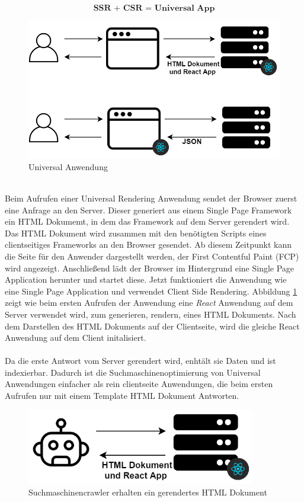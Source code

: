 \documentclass[runningheads]{llncs}
\numberwithin{figure}{section}
\begin{document}
\begin{equation*}
  \textbf{SSR + CSR = Universal App}
\end{equation*}
\begin{figure}[h]
  \centering
  \includegraphics[width=12cm]{images/react}
  \caption{Universal Anwendung}
  \label{Universal Anwendung}
\end{figure}
\\
Beim Aufrufen einer Universal Rendering Anwendung sendet der Browser
zuerst eine Anfrage an den Server. 
Dieser generiert aus einem Single Page Framework ein HTML Dokumemt,
in dem das Framework auf dem Server gerendert wird. 
Das HTML Dokument wird zusammen mit den benötigten Scripts eines clientseitiges Frameworks
an den Browser gesendet.
Ab diesem Zeitpunkt kann die Seite für den Anwender dargestellt werden, 
der First Contentful Paint (FCP) wird angezeigt. 
Anschließend lädt der Browser im Hintergrund eine Single Page Application herunter
und startet diese. 
Jetzt funktioniert die Anwendung wie eine Single Page Application und 
verwendet Client Side Rendering. Abbildung \ref{Universal Anwendung} zeigt wie beim 
ersten Aufrufen der Anwendung eine \textit{React} Anwendung auf dem Server verwendet wird,
zum generieren, rendern, eines HTML Dokuments. 
Nach dem Darstellen des HTML Dokuments auf der Clientseite, 
wird die gleiche React Anwendung auf dem Client initalisiert.
\\
\\
Da die erste Antwort vom Server gerendert wird, enhtält sie Daten und ist
indexierbar. Dadurch ist die Suchmaschinenoptimierung von Universal Anwendungen einfacher
als rein clientseite Anwendungen, die beim ersten Aufrufen nur mit einem Template
HTML Dokument Antworten.
\begin{figure}[h]
  \centering
  \includegraphics[width=10cm]{images/universalseo}
  \caption{Suchmaschinencrawler erhalten ein gerendertes HTML Dokument}
  \label{Suchmaschinencrawler erhalten ein gerendertes HTML Dokument}
\end{figure}
\end{document}
